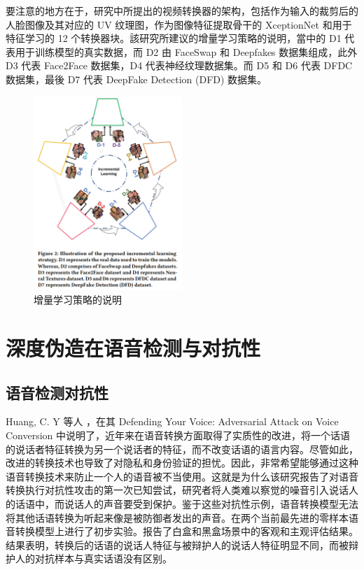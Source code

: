 要注意的地方在于，研究中所提出的视频转换器的架构，包括作为输入的裁剪后的人脸图像及其对应的 UV 纹理图，作为图像特征提取骨干的 XceptionNet 和用于特征学习的 12 个转换器块。該研究所建议的增量学习策略的说明，當中的 D1 代表用于训练模型的真实数据，而 D2 由 FaceSwap 和 Deepfakes 数据集组成，此外 D3 代表 Face2Face 数据集，D4 代表神经纹理数据集。而 D5 和 D6 代表 DFDC 数据集，最後 D7 代表 DeepFake Detection (DFD) 数据集。

\begin{figure}[htb]
\centering 
\includegraphics[width=0.50\textwidth]{img/p3m2.png} 
\caption{增量学习策略的说明}
\label{Test}
\end{figure}

\section{深度伪造在语音检测与对抗性}

\subsection{语音检测对抗性}

Huang, C. Y 等人 \cite{9383529}，在其 Defending Your Voice: Adversarial Attack on Voice Conversion 中说明了，近年来在语音转换方面取得了实质性的改进，将一个话语的说话者特征转换为另一个说话者的特征，而不改变话语的语言内容。尽管如此，改进的转换技术也导致了对隐私和身份验证的担忧。因此，非常希望能够通过这种语音转换技术来防止一个人的语音被不当使用。这就是为什么该研究报告了对语音转换执行对抗性攻击的第一次已知尝试，研究者将人类难以察觉的噪音引入说话人的话语中，而说话人的声音要受到保护。鉴于这些对抗性示例，语音转换模型无法将其他话语转换为听起来像是被防御者发出的声音。在两个当前最先进的零样本语音转换模型上进行了初步实验。报告了白盒和黑盒场景中的客观和主观评估结果。结果表明，转换后的话语的说话人特征与被辩护人的说话人特征明显不同，而被辩护人的对抗样本与真实话语没有区别。

